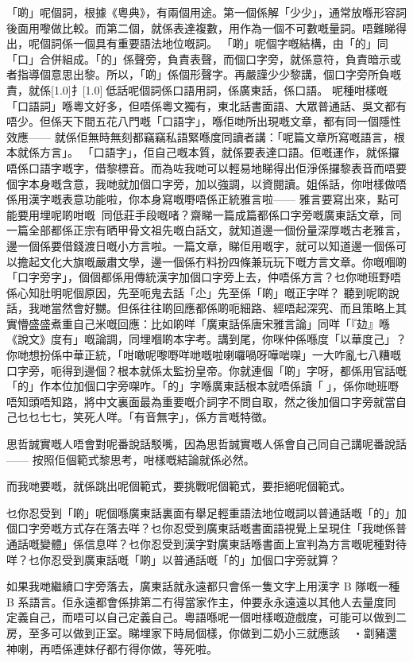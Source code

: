 \documentclass[a5paper, 12pt, openany]{book} %
\begin{document}
「啲」呢個詞，根據《粵典》，有兩個用途。第一個係解「少少」，通常放喺形容詞後面用嚟做比較。而第二個，就係表達複數，用作為一個不可數嘅量詞。唔難睇得出，呢個詞係一個具有重要語法地位嘅詞。
「啲」呢個字嘅結構，由「的」同「口」合併組成。「的」係聲旁，負責表聲，而個口字旁，就係意符，負責暗示或者指導個意思出黎。所以，「啲」係個形聲字。再嚴謹少少黎講，個口字旁所負嘅責，就係\scalebox{0.5}[1.0]{扌}\scalebox{0.5}[1.0]{󰖖}低話呢個詞係口語用詞，係廣東話，係口語。
呢種咁樣嘅「口語詞」喺粵文好多，但唔係粵文獨有，東北話書面語、大眾普通話、吳文都有唔少。但係天下間五花八門嘅「口語字」，喺佢哋所出現嘅文章，都有同一個隱性效應—— 就係佢無時無刻都竊竊私語緊喺度同讀者講：「呢篇文章所寫嘅語言，根本就係方言」。
「口語字」，佢自己嘅本質，就係要表達口語。佢嘅運作，就係攞唔係口語字嘅字，借黎標音。而為咗我哋可以輕易地睇得出佢淨係攞黎表音而唔要個字本身嘅含意，我哋就加個口字旁，加以強調，以資閱讀。姐係話，你咁樣做唔係用漢字嘅表意功能啦，你本身寫嘅嘢唔係正統雅言啦—— 雅言要寫出來，點可能要用埋呢啲咁嘅同低莊手段嘅啫？齋睇一篇成篇都係口字旁嘅廣東話文章，同一篇全部都係正宗有晒甲骨文祖先嘅白話文，就知道邊一個份量深厚嘅古老雅言，邊一個係要借錢渡日嘅小方言啦。一篇文章，睇佢用嘅字，就可以知道邊一個係可以擔起文化大旗嘅嚴肅文學，邊一個係冇料扮四條兼玩玩下嘅方言文章。你嘅嗰啲「口字旁字」，個個都係用傳統漢字加個口字旁上去，仲唔係方言？乜你哋班野唔係心知肚明呢個原因，先至呃鬼去話「尐」先至係「啲」嘅正字咩？
聽到呢啲說話，我哋當然會好嬲。但係往往啲回應都係啲呃細路、經唔起深究、而且策略上其實懵盛盛煮重自己米嘅回應：比如啲咩「廣東話係唐宋雅言論」同咩「『攰』喺《說文》度有」嘅論調，同埋嗰啲本字考。講到尾，你咪仲係喺度「以華度己」？你哋想扮係中華正統，「咁噉呢嚟嘢咩哋嘅啦喇囉喎呀嘩啱㗎」一大咋亂七八糟嘅口字旁，呃得到邊個？根本就係太監扮皇帝。你就連個「啲」字呀，都係用官話嘅「的」作本位加個口字旁㗎咋。「的」字喺廣東話根本就唔係讀「󰦦」，係你哋班嘢唔知頭唔知路，將中文裏面最為重要嘅介詞字不問自取，然之後加個口字旁就當自己乜乜七七，笑死人咩。「有音無字」，係方言嘅特徵。

思哲誠實嘅人唔會對呢番說話駁嘴，因為思哲誠實嘅人係會自己同自己講呢番說話—— 按照佢個範式黎思考，咁樣嘅結論就係必然。

而我哋要嘅，就係跳出呢個範式，要挑戰呢個範式，要拒絕呢個範式。

乜你忍受到「啲」呢個喺廣東話裏面有舉足輕重語法地位嘅詞以普通話嘅「的」加個口字旁嘅方式存在落去咩？乜你忍受到廣東話嘅書面語視覺上呈現住「我哋係普通話嘅變體」係信息咩？乜你忍受到漢字對廣東話喺書面上宣判為方言嘅呢種對待咩？乜你忍受到廣東話嘅「啲」以普通話嘅「的」加個口字旁就算？

如果我哋繼續口字旁落去，廣東話就永遠都只會係一隻文字上用漢字 B 隊嘅一種 B 系語言。佢永遠都會係排第二冇得當家作主，仲要永永遠遠以其他人去量度同定義自己，而唔可以自己定義自己。粵語喺呢一個咁樣嘅遊戲度，可能可以做到二房，至多可以做到正室。睇埋家下時局個樣，你做到二奶小三就應該・劏豬還神喇，再唔係連妹仔都冇得你做，等死啦。
\end{document}
